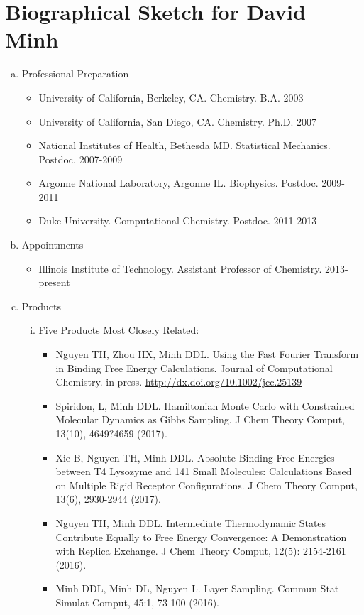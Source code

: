 \section*{Biographical Sketch for David Minh}

\begin{enumerate}[(a)]

\item Professional Preparation
\begin{itemize}
\item University of California, Berkeley, CA. Chemistry. B.A. 2003
\item University of California, San Diego, CA. Chemistry. Ph.D. 2007
\item National Institutes of Health, Bethesda MD. Statistical Mechanics. Postdoc. 2007-2009
\item Argonne National Laboratory, Argonne IL. Biophysics. Postdoc. 2009-2011
\item Duke University. Computational Chemistry. Postdoc. 2011-2013
\end{itemize}

\item Appointments
\begin{itemize}
\item Illinois Institute of Technology. Assistant Professor of Chemistry. 2013-present
\end{itemize}

\item Products
\begin{enumerate}[(i)]
\item Five Products Most Closely Related:
\begin{itemize}
\item Nguyen TH, Zhou HX, Minh DDL. Using the Fast Fourier Transform in Binding Free Energy Calculations. Journal of Computational Chemistry. in press. \url{http://dx.doi.org/10.1002/jcc.25139}
\item Spiridon, L, Minh DDL. Hamiltonian Monte Carlo with Constrained Molecular Dynamics as Gibbs Sampling. J Chem Theory Comput, 13(10), 4649?4659 (2017). %
\item Xie B, Nguyen TH, Minh DDL. Absolute Binding Free Energies between T4 Lysozyme and 141 Small Molecules: Calculations Based on Multiple Rigid Receptor Configurations. J Chem Theory Comput, 13(6), 2930-2944 (2017). %
\item Nguyen TH, Minh DDL. Intermediate Thermodynamic States Contribute Equally to Free Energy Convergence: A Demonstration with Replica Exchange. J Chem Theory Comput, 12(5): 2154-2161 (2016). %
\item Minh DDL, Minh DL, Nguyen L. Layer Sampling. Commun Stat Simulat Comput, 45:1, 73-100 (2016). %
\end{itemize}


\end{enumerate}
\end{enumerate}
